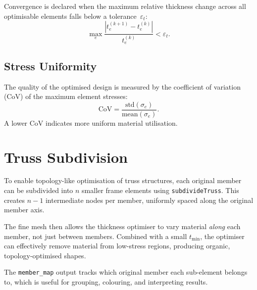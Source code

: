 Convergence is declared when the maximum relative thickness change across
all optimisable elements falls below a tolerance~$\varepsilon_t$:
%
\begin{equation}
    \max_e \frac{|t^{(k+1)}_e - t^{(k)}_e|}{t^{(k)}_e} < \varepsilon_t.
\end{equation}

\subsection{Stress Uniformity}

The quality of the optimised design is measured by the coefficient of
variation (CoV) of the maximum element stresses:
%
\begin{equation}
    \text{CoV} = \frac{\text{std}(\sigma_e)}{\text{mean}(\sigma_e)}.
\end{equation}
%
A lower CoV indicates more uniform material utilisation.

\section{Truss Subdivision}
\label{sec:subdivision}

To enable topology-like optimisation of truss structures, each original
member can be subdivided into $n$ smaller frame elements using
\texttt{subdivideTruss}.  This creates $n-1$ intermediate nodes per member,
uniformly spaced along the original member axis.

The fine mesh then allows the thickness optimiser to vary material
\emph{along} each member, not just between members.  Combined with a small
$t_{\min}$, the optimiser can effectively remove material from low-stress
regions, producing organic, topology-optimised shapes.

The \texttt{member\_map} output tracks which original member each
sub-element belongs to, which is useful for grouping, colouring, and
interpreting results.